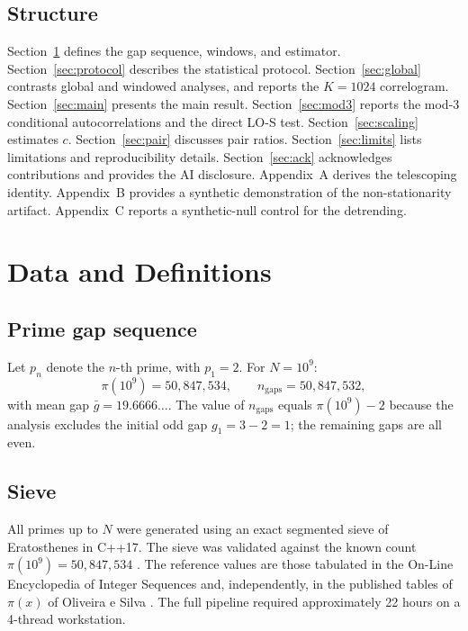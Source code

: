 \documentclass[11pt]{article}
\begin{document}
\subsection{Structure}
Section~\ref{sec:data} defines the gap sequence, windows, and
estimator. Section~\ref{sec:protocol} describes the statistical
protocol. Section~\ref{sec:global} contrasts global and windowed
analyses, and reports the $K = 1024$ correlogram. Section~\ref{sec:main}
presents the main result. Section~\ref{sec:mod3} reports the mod-3
conditional autocorrelations and the direct LO-S test.
Section~\ref{sec:scaling} estimates $c$. Section~\ref{sec:pair}
discusses pair ratios. Section~\ref{sec:limits} lists limitations and
reproducibility details. Section~\ref{sec:ack} acknowledges
contributions and provides the AI disclosure. Appendix~A derives the
telescoping identity. Appendix~B provides a synthetic demonstration of
the non-stationarity artifact. Appendix~C reports a synthetic-null
control for the detrending.

\section{Data and Definitions}\label{sec:data}

\subsection{Prime gap sequence}
Let $p_n$ denote the $n$-th prime, with $p_1 = 2$. For $N = 10^9$:
\begin{equation}
\pi(10^9) = 50{,}847{,}534, \qquad n_{\text{gaps}} = 50{,}847{,}532,
\label{eq:ngaps}
\end{equation}
with mean gap $\bar g = 19.6666\ldots$. The value of $n_{\text{gaps}}$
equals $\pi(10^9) - 2$ because the analysis excludes the initial odd
gap $g_1 = 3 - 2 = 1$; the remaining gaps are all even.

\subsection{Sieve}
All primes up to $N$ were generated using an exact segmented sieve of
Eratosthenes in C++17. The sieve was validated against the known count
$\pi(10^9) = 50{,}847{,}534$ \cite{OEIS_A006880}. The reference
values are those tabulated in the On-Line Encyclopedia of Integer
Sequences \cite{OEIS} and, independently, in the published tables of
$\pi(x)$ of Oliveira e Silva \cite{OliveiraSilva2007}. The full pipeline
required approximately 22 hours on a 4-thread workstation.
\end{document}
